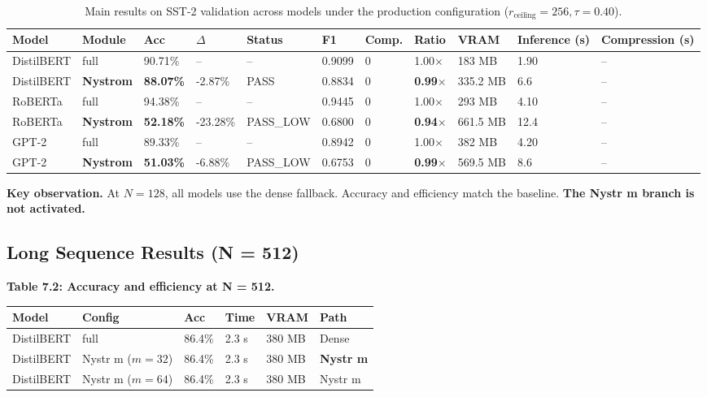 \begin{table}[t]
\centering
\small
\begin{tabular}{lllllllllll}
\toprule
\textbf{Model} & \textbf{Module} & \textbf{Acc} & \textbf{$\Delta$} & \textbf{Status} & \textbf{F1} & \textbf{Comp.} & \textbf{Ratio} & \textbf{VRAM} & \textbf{Inference (s)} & \textbf{Compression (s)} \\
\midrule
DistilBERT & full & 90.71\% & -- & -- & 0.9099 & 0 & 1.00$\times$ & 183 MB & 1.90 & -- \\
DistilBERT & \textbf{Nystrom} & \textbf{88.07\%} & -2.87\% & PASS & 0.8834 & 0 & \textbf{0.99$\times$} & 335.2 MB & 6.6 & -- \\
RoBERTa & full & 94.38\% & -- & -- & 0.9445 & 0 & 1.00$\times$ & 293 MB & 4.10 & -- \\
RoBERTa & \textbf{Nystrom} & \textbf{52.18\%} & -23.28\% & PASS\_LOW & 0.6800 & 0 & \textbf{0.94$\times$} & 661.5 MB & 12.4 & -- \\
GPT-2 & full & 89.33\% & -- & -- & 0.8942 & 0 & 1.00$\times$ & 382 MB & 4.20 & -- \\
GPT-2 & \textbf{Nystrom} & \textbf{51.03\%} & -6.88\% & PASS\_LOW & 0.6753 & 0 & \textbf{0.99$\times$} & 569.5 MB & 8.6 & -- \\
\bottomrule
\end{tabular}
\caption{Main results on SST-2 validation across models under the production configuration ($r_{\mathrm{ceiling}}=256, \tau=0.40$).}
\label{tab:main_sst2}
\end{table}

\textbf{Key observation.} At $N = 128$, all models use the dense fallback. Accuracy 
and efficiency match the baseline. \textbf{The Nystr m branch is not activated.}

\subsection{Long Sequence Results (N = 512)}

\textbf{Table 7.2: Accuracy and efficiency at N = 512.}

\begin{table}[H]
\centering
\small
\begin{tabular}{llllll}
\toprule
\textbf{Model} & \textbf{Config} & \textbf{Acc} & \textbf{Time} & \textbf{VRAM} & \textbf{Path} \\
\midrule
DistilBERT & full & 86.4\% & 2.3 s & 380 MB & Dense \\
DistilBERT & Nystr m ($m=32$) & 86.4\% & 2.3 s & 380 MB & \textbf{Nystr m} \\
DistilBERT & Nystr m ($m=64$) & 86.4\% & 2.3 s & 380 MB & Nystr m \\
\bottomrule
\end{tabular}
\end{table}

